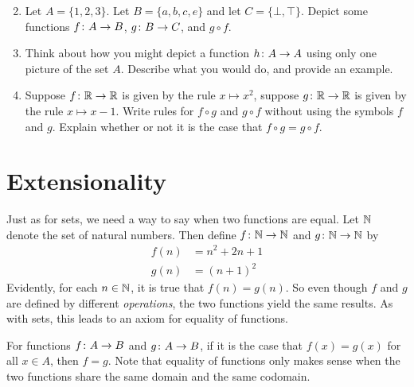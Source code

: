 \begin{exercises}
\begin{enumerate}[resume=exercises]
\begin{multicols}{2}
\begin{enumerate}
	  \end{enumerate}
	  \end{multicols}
		\item Let $A = \{1,2,3\}$. Let $B=\{a,b,c,e\}$ and let $C = \{\bot,\top\}$.
		Depict some functions ${f}\colon{A}\to{B}$, ${g}\colon{B}\to{C}$, and $g\circ f$. 
		\item Think about how you might depict a function ${h}\colon{A}\to{A}$ using only one picture of the set $A$.
		Describe what you would do, and provide an example.
		\item Suppose ${f}\colon{\mathbb R}\to{\mathbb R}$ is given by the rule $x\mapsto x^2$, suppose ${g}\colon{\mathbb R}\to{\mathbb R}$ is given
		by the rule $x\mapsto x-1$. Write rules for $f\circ g$ and $g\circ f$ without using the symbols $f$ and $g$. Explain whether or not it is the case that $f\circ g = g\circ f$.
	\end{enumerate}
\end{exercises}

\section{Extensionality}

Just as for sets, we need a way to say when two functions are equal.
Let $\mathbb N$ denote the set of natural numbers. 
Then define ${f}\colon{\mathbb N}\to{\mathbb N}$ and ${g}\colon{\mathbb N}\to{\mathbb N}$ by
\begin{align*}
f(n) &= n^2 +  2n + 1\\
g(n) &= (n+1)^2
\end{align*}
Evidently, for each $n\in\mathbb N$, it is true that $f(n) = g(n)$.
So even though $f$ and $g$ are defined by different \emph{operations}, the two functions yield the same results.
As with sets, this leads to an axiom for equality of functions.

\begin{principle}
	For functions ${f}\colon{A}\to{B}$ and ${g}\colon{A}\to{B}$, if it is the case that $f(x)=g(x)$ for all $x\in A$, then $f=g$.
	Note that equality of functions only makes sense when the two functions share the same domain and the same codomain.
\end{principle}

